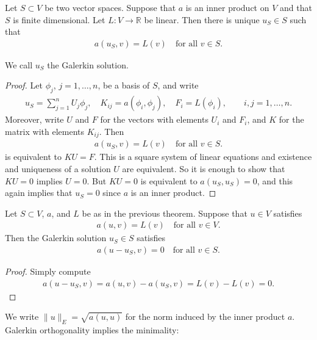 \documentclass[12pt,oneside,final]{amsart}
\begin{document}
\begin{theorem}\label{th_gsol}
Let $S \subset V$ be two vector spaces.
Suppose that $a$ is an inner product on $V$ and that $S$ is finite dimensional. 
Let $L : V \to \mathbb R$ be linear. Then there is unique $u_S \in S$ such that 
    \begin{align*}
a(u_S,v) = L(v) \quad \text{for all $v \in S$}.
    \end{align*}
\end{theorem}
We call $u_S$ the Galerkin solution.
\begin{proof}
Let $\phi_j$, $j=1,\dots,n$, be a basis of $S$, and write
    \begin{align*}
u_S = \sum_{j=1}^n U_j \phi_j, 
\quad
K_{ij} = a(\phi_i, \phi_j),
\quad
F_i = L(\phi_i), 
\qquad i,j=1,\dots,n.
    \end{align*}
Moreover, write $U$ and $F$ for the vectors with elements $U_i$ and $F_i$, and $K$ for the matrix with elements $K_{ij}$. Then
    \begin{align*}
a(u_S,v) = L(v) \quad \text{for all $v \in S$}.
    \end{align*}
is equivalent to $KU = F$. This is a square system of linear equations and existence and uniqueness of a solution $U$ are equivalent. So it is enough to show that $KU = 0$ implies $U = 0$. But $KU = 0$ is equivalent to $a(u_S, u_S) = 0$, and this again implies that $u_S = 0$ since $a$ is an inner product.
\end{proof}

\begin{lemma}
Let $S \subset V$, $a$, and $L$ be as in the previous theorem. Suppose that $u \in V$ satisfies
    \begin{align*}
a(u, v) = L(v) \quad \text{for all $v \in V$}.
    \end{align*}
Then the Galerkin solution $u_S  \in S$ satisfies
    \begin{align*}
a(u-u_S,v) = 0 \quad \text{for all $v \in S$}.
    \end{align*}
\end{lemma}
\begin{proof}
Simply compute
    \begin{align*}
a(u-u_S,v) = a(u, v) - a(u_S, v) = L(v) - L(v) = 0.
    \end{align*}
\end{proof}

We write $\|u\|_E = \sqrt{a(u,u)}$ for the norm induced by the inner product $a$. Galerkin orthogonality implies the minimality:
\end{document}
